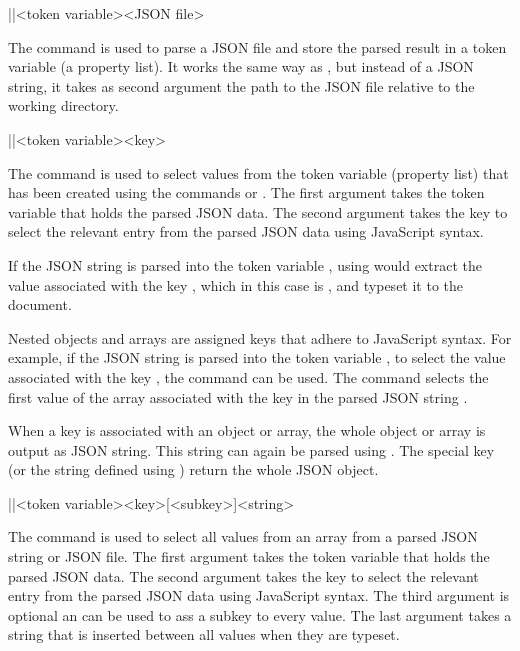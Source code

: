 \documentclass[a4paper]{article}
\begin{document}
\begin{macrodef}
|\JSONParseFromFile|{<token variable>}{<JSON file>}
\end{macrodef}
The command \macro{\JSONParseFromFile} is used to parse a JSON file and store the parsed result in a token variable (a property list). It works the same way as \macro{\JSONParse}, but instead of a JSON string, it takes as second argument the path to the JSON file relative to the working directory.

\begin{macrodef}
|\JSONParseGetValue|{<token variable>}{<key>}
\end{macrodef}
The command \macro{\JSONParseGetValue} is used to select values from the token variable (property list) that has been created using the commands \macro{\JSONParse} or \macro{\JSONParseFromFile}. The first argument takes the token variable that holds the parsed JSON data. The second argument takes the key to select the relevant entry from the parsed JSON data using JavaScript syntax.

If the JSON string  is parsed into the token variable \macro{\myJSONdata}, using  would extract the value associated with the key , which in this case is , and typeset it to the document.

Nested objects and arrays are assigned keys that adhere to JavaScript syntax. For example, if the JSON string  is parsed into the token variable \macro{\myJSONdata}, to select the value associated with the key , the command  can be used. The command  selects the first value of the array associated with the key  in the parsed JSON string .

When a key is associated with an object or array, the whole object or array is output as JSON string. This string can again be parsed using \macro{\JSONParse}. The special key  (or the string defined using \macro{\JSONParseSetChildSeparator}) return the whole JSON object.

\begin{macrodef}
|\JSONParseGetArrayValues|{<token variable>}{<key>}[<subkey>]{<string>}
\end{macrodef}
The command \macro{\JSONParseGetArrayValues} is used to select all values from an array from a parsed JSON string or JSON file. The first argument takes the token variable that holds the parsed JSON data. The second argument takes the key to select the relevant entry from the parsed JSON data using JavaScript syntax. The third argument is optional an can be used to ass a subkey to every value. The last argument takes a string that is inserted between all values when they are typeset.
\end{document}
